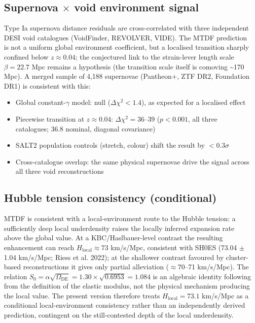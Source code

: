 \documentclass[11pt,a4paper]{article}
\begin{document}
\subsection{Supernova $\times$ void environment signal}
Type Ia supernova distance residuals are cross-correlated with three independent DESI void catalogues (VoidFinder, REVOLVER, VIDE). The MTDF prediction is not a uniform global environment coefficient, but a localised transition sharply confined below $z \approx 0.04$; the conjectured link to the strain-lever length scale $\beta = 22.7$ Mpc remains a hypothesis (the transition scale itself is comoving \~{}170 Mpc). A merged sample of 4,188 supernovae (Pantheon+, ZTF DR2, Foundation DR1) is consistent with this:

\begin{itemize}
  \item Global constant-$\gamma$ model: null ($\Delta\chi^2 < 1.4$), as expected for a localised effect
  \item Piecewise transition at $z \approx 0.04$: $\Delta\chi^2 = 36$--$39$ ($p < 0.001$, all three catalogues; 36.8 nominal, diagonal covariance)
  \item SALT2 population controls (stretch, colour) shift the result by $< 0.3\sigma$
  \item Cross-catalogue overlap: the same physical supernovae drive the signal across all three void reconstructions
\end{itemize}

\subsection{Hubble tension consistency (conditional)}
MTDF is consistent with a local-environment route to the Hubble tension: a sufficiently deep local underdensity raises the locally inferred expansion rate above the global value. At a KBC/\allowbreak{}Haslbauer-level contrast the resulting enhancement can reach $H_\text{local} \approx 73$ km/\allowbreak{}s/\allowbreak{}Mpc, consistent with SH0ES (73.04 $\pm$ 1.04 km/\allowbreak{}s/\allowbreak{}Mpc; Riess et al. 2022); at the shallower contrast favoured by cluster-based reconstructions it gives only partial alleviation ($\approx 70$--71 km/\allowbreak{}s/\allowbreak{}Mpc). The relation $S_0 = \alpha\sqrt{\Omega_\text{DE}} = 1.30 \times \sqrt{0.6953} = 1.084$ is an algebraic identity following from the definition of the elastic modulus, not the physical mechanism producing the local value. The present version therefore treats $H_\text{local} = 73.1$ km/\allowbreak{}s/\allowbreak{}Mpc as a conditional local-environment consistency rather than an independently derived prediction, contingent on the still-contested depth of the local underdensity.
\end{document}
